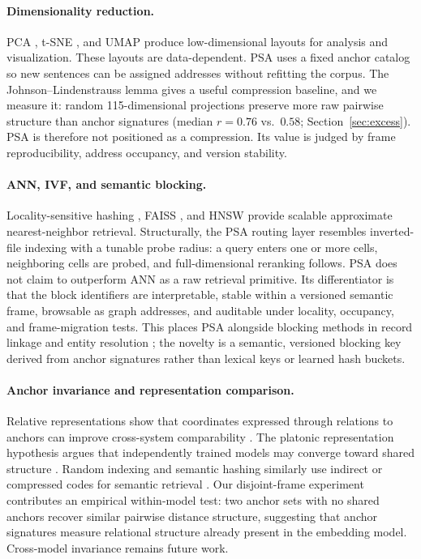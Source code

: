 \documentclass[11pt]{article}
\begin{document}
\paragraph{Dimensionality reduction.}
PCA \citep{pearson1901lines}, t-SNE \citep{vandermaaten2008visualizing}, and UMAP \citep{mcinnes2018umap} produce low-dimensional layouts for analysis and visualization. These layouts are data-dependent. PSA uses a fixed anchor catalog so new sentences can be assigned addresses without refitting the corpus. The Johnson--Lindenstrauss lemma \citep{johnson1984extensions} gives a useful compression baseline, and we measure it: random 115-dimensional projections preserve more raw pairwise structure than anchor signatures (median $r=0.76$ vs.\ $0.58$; Section~\ref{sec:excess}). PSA is therefore not positioned as a compression. Its value is judged by frame reproducibility, address occupancy, and version stability.

\paragraph{ANN, IVF, and semantic blocking.}
Locality-sensitive hashing \citep{indyk1998approximate}, FAISS \citep{johnson2019billion}, and HNSW \citep{malkov2020hnsw} provide scalable approximate nearest-neighbor retrieval. Structurally, the PSA routing layer resembles inverted-file indexing with a tunable probe radius: a query enters one or more cells, neighboring cells are probed, and full-dimensional reranking follows. PSA does not claim to outperform ANN as a raw retrieval primitive. Its differentiator is that the block identifiers are interpretable, stable within a versioned semantic frame, browsable as graph addresses, and auditable under locality, occupancy, and frame-migration tests. This places PSA alongside blocking methods in record linkage and entity resolution \citep{fellegi1969record,christen2012data}; the novelty is a semantic, versioned blocking key derived from anchor signatures rather than lexical keys or learned hash buckets.

\paragraph{Anchor invariance and representation comparison.}
Relative representations show that coordinates expressed through relations to anchors can improve cross-system comparability \citep{moschella2023relative}. The platonic representation hypothesis argues that independently trained models may converge toward shared structure \citep{huh2024platonic}. Random indexing and semantic hashing similarly use indirect or compressed codes for semantic retrieval \citep{kanerva2000random,salakhutdinov2009semantic}. Our disjoint-frame experiment contributes an empirical within-model test: two anchor sets with no shared anchors recover similar pairwise distance structure, suggesting that anchor signatures measure relational structure already present in the embedding model. Cross-model invariance remains future work.
\end{document}
